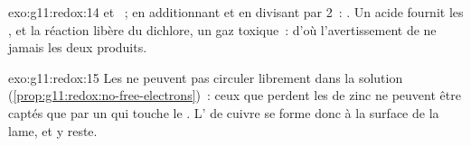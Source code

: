 \begin{solution}{exo:g11:redox:14}
 et ~; en
additionnant et en divisant par 2~: .
Un acide fournit les  , et la réaction libère du dichlore, un
gaz toxique~: d'où l'avertissement de ne jamais  les deux
produits.
\end{solution}

\begin{solution}{exo:g11:redox:15}
Les  ne peuvent pas circuler librement dans la solution
(\cref{prop:g11:redox:no-free-electrons})~: ceux que perdent les 
de zinc ne peuvent être captés que par un   qui touche le
. L' de cuivre se forme donc à la surface de la lame, et y
reste.
\end{solution}

